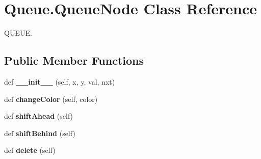 \hypertarget{class_queue_1_1_queue_node}{}\section{Queue.\+Queue\+Node Class Reference}
\label{class_queue_1_1_queue_node}


Q\+U\+E\+UE.  


\subsection*{Public Member Functions}
\begin{DoxyCompactItemize}
\item 
\mbox{\label{class_queue_1_1_queue_node_acfe34780ae926af46ebe32a58c8e030c}} 
def {\bfseries \+\_\+\+\_\+init\+\_\+\+\_\+} (self, x, y, val, nxt)
\item 
\mbox{\label{class_queue_1_1_queue_node_a97a3e71ba6dddf6a6d40d4222402238b}} 
def {\bfseries change\+Color} (self, color)
\item 
\mbox{\label{class_queue_1_1_queue_node_a71dbaccc8320cb100d14fcf8c8764c83}} 
def {\bfseries shift\+Ahead} (self)
\item 
\mbox{\label{class_queue_1_1_queue_node_ac4f2637c989e8d98c5bf20ce9481dce4}} 
def {\bfseries shift\+Behind} (self)
\item 
\mbox{\label{class_queue_1_1_queue_node_af50c356dd13964a0378e13034eec53ca}} 
def {\bfseries delete} (self)
\end{DoxyCompactItemize}
